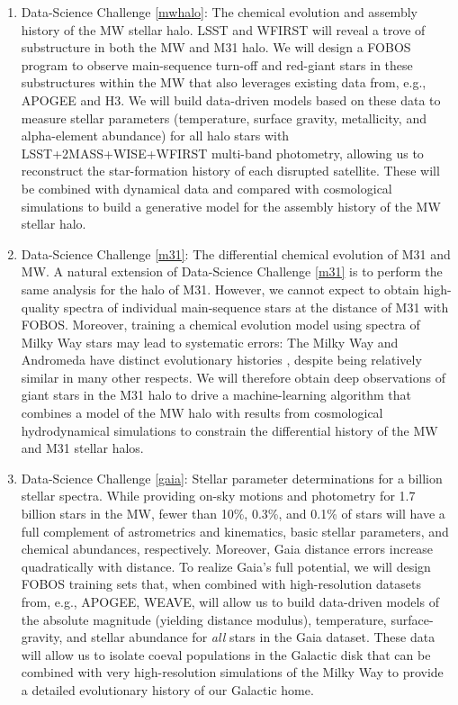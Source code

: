 \documentclass[oneside,11pt]{amsart}
\newcounter{chalno}
\newcommand{\chal}[1]{\refstepcounter{chalno}\label{#1}}
\begin{document}
\begin{enumerate}[rightmargin=0.2cm,leftmargin=0.2cm]

\chal{mwhalo} 
%
\item[] {\textsf {\large  Data-Science Challenge \ref{mwhalo}: The
chemical evolution and assembly history of the MW stellar halo.}} LSST
and WFIRST will reveal a trove of substructure in both the MW and M31
halo.  We will design a FOBOS program to observe main-sequence turn-off
and red-giant stars in these substructures within the MW that also
leverages existing data from, e.g., APOGEE and H3.  We will build
data-driven models based on these data to measure stellar parameters
(temperature, surface gravity, metallicity, and alpha-element abundance)
for all halo stars with LSST+2MASS+WISE+WFIRST multi-band photometry,
allowing us to reconstruct the star-formation history of each disrupted
satellite. These will be combined with dynamical data and compared with
cosmological simulations to build a generative model for the assembly
history of the MW stellar halo.

\chal{m31} 
%
\item[] {\textsf {\large Data-Science Challenge \ref{m31}: The
differential chemical evolution of M31 and MW.}}  A natural extension of
Data-Science Challenge \ref{m31} is to perform the same analysis for the
halo of M31.  However, we cannot expect to obtain high-quality spectra
of individual main-sequence stars at the distance of M31 with FOBOS.
Moreover, training a chemical evolution model using spectra of Milky Way
stars may lead to systematic errors:  The Milky Way and Andromeda have
distinct evolutionary histories \citep[e.g.][]{2005MNRAS.356.1071R},
despite being relatively similar in many other respects.  We will
therefore obtain deep observations of giant stars in the M31 halo to
drive a machine-learning algorithm that combines a model of the MW halo
with results from cosmological hydrodynamical simulations to constrain
the differential history of the MW and M31 stellar halos.

\chal{gaia} 
%
\item[] {\textsf {\large Data-Science Challenge \ref{gaia}: Stellar
parameter determinations for a billion stellar spectra.}} While
providing on-sky motions and photometry for 1.7 billion stars in the MW,
fewer than 10\%, 0.3\%, and 0.1\% of stars will have a full complement
of astrometrics and kinematics, basic stellar parameters, and chemical
abundances, respectively.  Moreover, Gaia distance errors increase
quadratically with distance.  To realize Gaia's full potential, we will
design FOBOS training sets that, when combined with high-resolution
datasets from, e.g., APOGEE, WEAVE, will allow us to build data-driven
models of the absolute magnitude (yielding distance modulus),
temperature, surface-gravity, and stellar abundance for {\it all} stars
in the Gaia dataset.  These data will allow us to isolate coeval
populations in the Galactic disk that can be combined with very
high-resolution simulations of the Milky Way to provide a detailed
evolutionary history of our Galactic home.

\end{enumerate}
\end{document}
